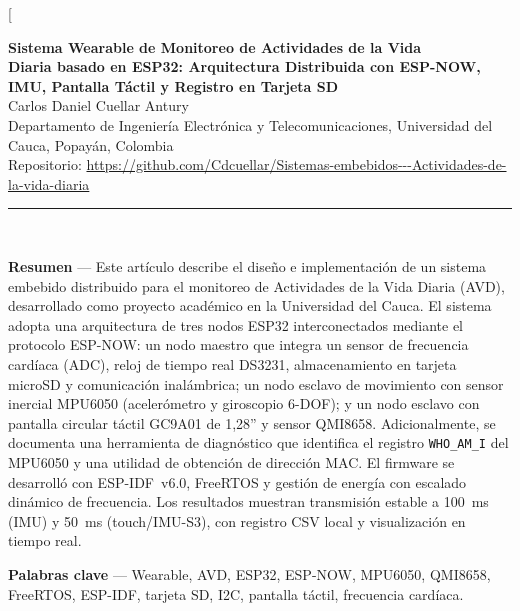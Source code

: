 \documentclass[10pt,twocolumn,a4paper]{article}
\begin{document}
\twocolumn[{%
\begin{center}
  {\large\bfseries Sistema Wearable de Monitoreo de Actividades de la Vida\\[2pt]
  Diaria basado en ESP32: Arquitectura Distribuida con ESP-NOW,\\[2pt]
  IMU, Pantalla Táctil y Registro en Tarjeta SD}\\[6pt]
  {\normalsize Carlos Daniel Cuellar Antury}\\[2pt]
  {\small Departamento de Ingeniería Electrónica y Telecomunicaciones,
  Universidad del Cauca, Popayán, Colombia}\\[2pt]
  {\footnotesize Repositorio: \url{https://github.com/Cdcuellar/Sistemas-embebidos---Actividades-de-la-vida-diaria}}\\[6pt]
  \rule{\linewidth}{0.5pt}\\[4pt]
\end{center}
\begin{small}
\noindent\textbf{Resumen} — Este artículo describe el diseño e implementación de un
sistema embebido distribuido para el monitoreo de Actividades de la Vida Diaria
(AVD), desarrollado como proyecto académico en la Universidad del Cauca. El
sistema adopta una arquitectura de tres nodos ESP32 interconectados mediante el
protocolo ESP-NOW: un nodo maestro que integra un sensor de frecuencia cardíaca
(ADC), reloj de tiempo real DS3231, almacenamiento en tarjeta microSD y
comunicación inalámbrica; un nodo esclavo de movimiento con sensor inercial
MPU6050 (acelerómetro y giroscopio 6-DOF); y un nodo esclavo con pantalla
circular táctil GC9A01 de 1,28'' y sensor QMI8658. Adicionalmente, se documenta
una herramienta de diagnóstico que identifica el registro \texttt{WHO\_AM\_I}
del MPU6050 y una utilidad de obtención de dirección MAC. El firmware se
desarrolló con ESP-IDF~v6.0, FreeRTOS y gestión de energía con escalado dinámico
de frecuencia. Los resultados muestran transmisión estable a 100~ms (IMU) y
50~ms (touch/IMU-S3), con registro CSV local y visualización en tiempo real.

\smallskip
\noindent\textbf{Palabras clave} — Wearable, AVD, ESP32, ESP-NOW, MPU6050,
QMI8658, FreeRTOS, ESP-IDF, tarjeta SD, I2C, pantalla táctil, frecuencia
cardíaca.


\end{small}}
\end{document}
